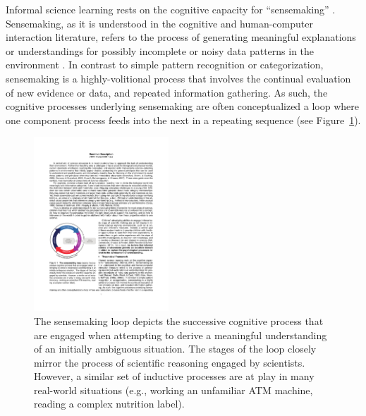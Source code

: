 \documentclass[10pt,letterpaper]{article}
\begin{document}

Informal science learning rests on the cognitive capacity for ``sensemaking'' \cite{Renner:2011}. Sensemaking, as it is understood in the cognitive and human-computer interaction literature, refers to the process of generating meaningful explanations or understandings for possibly incomplete or noisy data patterns in the environment \cite{Russell:1993,Klein:2006a,Klein:2006b}. In contrast to simple pattern recognition or categorization, sensemaking is a highly-volitional process that involves the continual evaluation of new evidence or data, and repeated information gathering. As such, the cognitive processes underlying sensemaking are often conceptualized a loop where one component process feeds into the next in a repeating sequence (see Figure~\ref{fig:sensemaking_loop}).

\begin{figure}[!h]
  \centering
  \includegraphics[width=0.45\textwidth]{figures/sensemaking_loop}
  \caption{The sensemaking loop depicts the successive cognitive process that are engaged when attempting to derive a meaningful understanding of an initially ambiguous situation. The stages of the loop closely mirror the process of scientific reasoning engaged by scientists. However, a similar set of inductive processes are at play in many real-world situations (e.g., working an unfamiliar ATM machine, reading a complex nutrition label).}
  \label{fig:sensemaking_loop}
\end{figure} 
\end{document}
